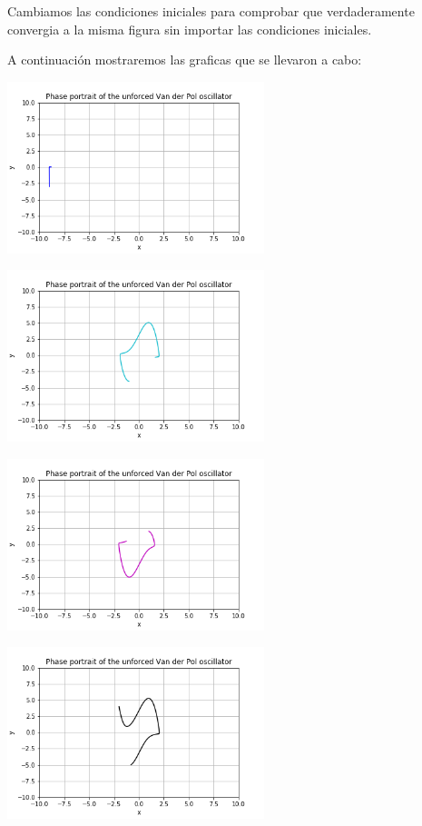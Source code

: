 \documentclass{article}
\begin{document}
Cambiamos las condiciones iniciales para comprobar que verdaderamente convergia a la misma figura sin importar las condiciones iniciales.

A continuación mostraremos las graficas que se llevaron a cabo:

\begin{center}
\includegraphics[height=5cm]{extra1_1.png}
\end{center}

\begin{center}
\includegraphics[height=5cm]{extra2.png}
\end{center}

\begin{center}
\includegraphics[height=5cm]{extra3.png}
\end{center}

\begin{center}
\includegraphics[height=5cm]{extra4.png}
\end{center}
\end{document}
